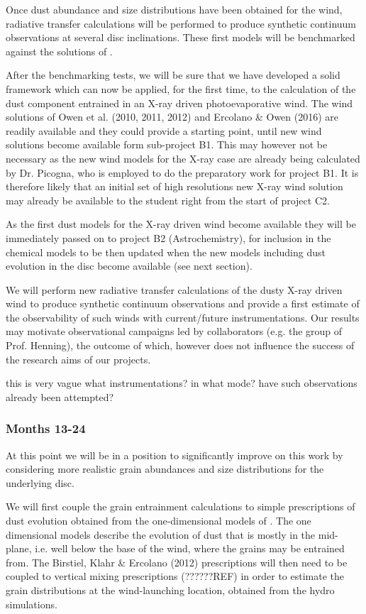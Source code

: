 \documentclass[10pt,fleqn,twoside]{article}
\begin{document}
Once dust abundance and size distributions have been obtained for the
wind, radiative transfer calculations will be performed to produce
synthetic continuum observations at several disc inclinations. 
These first models will be benchmarked against the solutions
of \citet{2011MNRAS.411.1104O}.

After the benchmarking tests, we will be sure that we have developed a
solid framework which can now be applied, for the
first time, to the calculation of the dust component entrained in an
X-ray driven photoevaporative wind. The wind solutions of Owen et
al. (2010, 2011, 2012) and Ercolano \& Owen (2016) are readily
available and they could provide a starting point, until new 
wind solutions become available form sub-project B1. This may however
not be necessary as the new wind models for the X-ray case
are already being calculated by Dr. Picogna, who is employed to do the
preparatory work for project B1. It is therefore likely that an
initial set of high resolutions new X-ray wind solution may already be
available to the student right from the start of project C2.
 
As the first dust models for the X-ray driven wind become available
they will be immediately passed on to project B2 (Astrochemistry), for
inclusion in the chemical models to be then updated when the new
models including dust evolution in the disc become available (see next
section). 

We will perform new radiative transfer calculations of the dusty
X-ray driven wind to produce synthetic continuum observations and
provide a first estimate of the observability of such winds with
current/future instrumentations. Our results may motivate
observational campaigns led by collaborators (e.g. the group of
Prof. Henning), the outcome of which, however does not influence the
success of the research aims of our projects. 

 {\color{green} this is very vague what
  instrumentations? in what mode? have such observations already been
  attempted?}


\subsubsection{Months 13-24}
 
At this point we will be in a position to significantly improve on
this work by considering more realistic grain abundances and size
distributions for the underlying disc. 

We will first couple the grain entrainment calculations to simple
prescriptions of dust  evolution \citep[e.g.,][]{2012A&A...539A.148B}
obtained from the one-dimensional models of
\citet{2010A&A...513A..79B}. The one dimensional models describe the
evolution of dust that is mostly in the mid-plane, i.e. well below the
base of the wind, where the grains may be entrained from. The
Birstiel, Klahr \& Ercolano (2012) prescriptions will then need to be
coupled to vertical mixing prescriptions (??????REF) in order to
estimate the grain distributions at the wind-launching location,
obtained from the hydro simulations. 
\end{document}

